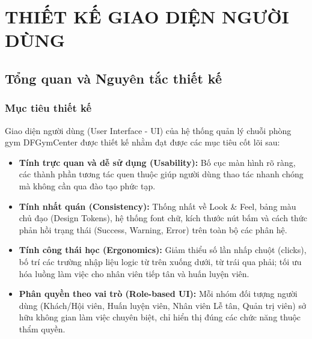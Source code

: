 \documentclass[12pt,a4paper]{report}
\begin{document}
\chapter{THIẾT KẾ GIAO DIỆN NGƯỜI DÙNG}
\label{chap:thietkegiaodien}

\section{Tổng quan và Nguyên tắc thiết kế}

\subsection{Mục tiêu thiết kế}
Giao diện người dùng (User Interface - UI) của hệ thống quản lý chuỗi phòng gym DFGymCenter được thiết kế nhằm đạt được các mục tiêu cốt lõi sau:
\begin{itemize}
    \item \textbf{Tính trực quan và dễ sử dụng (Usability):} Bố cục màn hình rõ ràng, các thành phần tương tác quen thuộc giúp người dùng thao tác nhanh chóng mà không cần qua đào tạo phức tạp.
    \item \textbf{Tính nhất quán (Consistency):} Thống nhất về Look \& Feel, bảng màu chủ đạo (Design Tokens), hệ thống font chữ, kích thước nút bấm và cách thức phản hồi trạng thái (Success, Warning, Error) trên toàn bộ các phân hệ.
    \item \textbf{Tính công thái học (Ergonomics):} Giảm thiểu số lần nhấp chuột (clicks), bố trí các trường nhập liệu logic từ trên xuống dưới, từ trái qua phải; tối ưu hóa luồng làm việc cho nhân viên tiếp tân và huấn luyện viên.
    \item \textbf{Phân quyền theo vai trò (Role-based UI):} Mỗi nhóm đối tượng người dùng (Khách/Hội viên, Huấn luyện viên, Nhân viên Lễ tân, Quản trị viên) sở hữu không gian làm việc chuyên biệt, chỉ hiển thị đúng các chức năng thuộc thẩm quyền.
\end{itemize}
\end{document}
